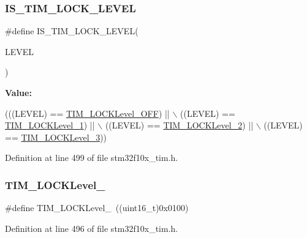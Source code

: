 \subsubsection{\texorpdfstring{I\+S\+\_\+\+T\+I\+M\+\_\+\+L\+O\+C\+K\+\_\+\+L\+E\+V\+EL}{IS\_TIM\_LOCK\_LEVEL}}
{\footnotesize\ttfamily \#define I\+S\+\_\+\+T\+I\+M\+\_\+\+L\+O\+C\+K\+\_\+\+L\+E\+V\+EL(\begin{DoxyParamCaption}\item[{}]{L\+E\+V\+EL }\end{DoxyParamCaption})}

{\bfseries Value\+:}
\begin{DoxyCode}
(((LEVEL) == \hyperlink{group___lock__level_ga84d318c62d3e5dfe7082610d03e11f2f}{TIM\_LOCKLevel\_OFF}) || \(\backslash\)
                                  ((LEVEL) == \hyperlink{group___lock__level_ga7e4326fc7756ebf5e9eb9776c2734aea}{TIM\_LOCKLevel\_1}) || \(\backslash\)
                                  ((LEVEL) == \hyperlink{group___lock__level_ga91bdf218f766e6a10b7a7df407250d25}{TIM\_LOCKLevel\_2}) || \(\backslash\)
                                  ((LEVEL) == \hyperlink{group___lock__level_gaa0a0c1ffd9dc582d6571780c1747920b}{TIM\_LOCKLevel\_3}))
\end{DoxyCode}


Definition at line 499 of file stm32f10x\+\_\+tim.\+h.

\mbox{\label{group___lock__level_ga7e4326fc7756ebf5e9eb9776c2734aea}} 
\subsubsection{\texorpdfstring{T\+I\+M\+\_\+\+L\+O\+C\+K\+Level\+\_}{TIM\_LOCKLevel\_1}}
{\footnotesize\ttfamily \#define T\+I\+M\+\_\+\+L\+O\+C\+K\+Level\+\_~((uint16\+\_\+t)0x0100)}



Definition at line 496 of file stm32f10x\+\_\+tim.\+h.

\mbox{\label{group___lock__level_ga91bdf218f766e6a10b7a7df407250d25}} 
